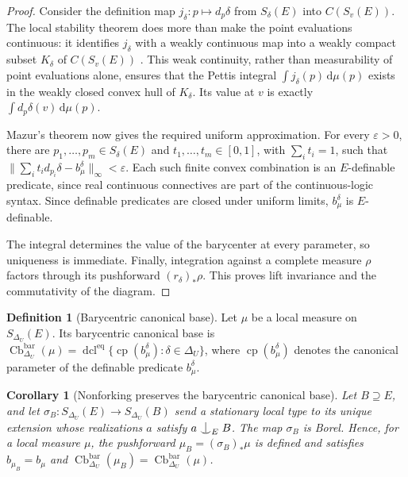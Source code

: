 \documentclass{amsart}
\newtheorem{corollary}[theorem]{Corollary}
\theoremstyle{definition}
\newtheorem{definition}{Definition}[section]
\theoremstyle{remark}
\newcommand{\forkindep}[1][]{%
	\mathrel{
		\mathop{
			\vcenter{
				\hbox{\oalign{\noalign{\kern-.3ex}\hfil$\vert$\hfil\cr
						\noalign{\kern-.7ex}
						$\smile$\cr\noalign{\kern-.3ex}}}
			}
		}\displaylimits_{#1}
	}
}
\numberwithin{equation}{section}
\begin{document}
\begin{proof}
Consider the definition map $j_\delta:p\mapsto d_p\delta$ from $S_\delta(E)$ into $C(S_v(E))$. The local stability theorem does more than make the point evaluations continuous: it identifies $j_\delta$ with a weakly continuous map into a weakly compact subset $K_\delta$ of $C(S_v(E))$ \cite[Proposition~7.7]{Yaacov2008CONTINUOUSFO}. This weak continuity, rather than measurability of point evaluations alone, ensures that the Pettis integral $\int j_\delta(p)\,\mathrm{d}\mu(p)$ exists in the weakly closed convex hull of $K_\delta$. Its value at $v$ is exactly $\int d_p\delta(v)\,\mathrm{d}\mu(p)$.

Mazur's theorem now gives the required uniform approximation. For
every $\varepsilon>0$, there are
$p_1,\ldots,p_m\in S_\delta(E)$ and
$t_1,\ldots,t_m\in[0,1]$, with $\sum_it_i=1$, such that
$\|\sum_it_id_{p_i}\delta-b_\mu^\delta\|_\infty<\varepsilon$.
Each such finite convex combination is an $E$-definable predicate, since real continuous connectives are part of the continuous-logic syntax. %
Since definable predicates are closed under uniform limits,
$b_\mu^\delta$ is $E$-definable.

The integral determines the value of the barycenter at every
parameter, so uniqueness is immediate. Finally, integration against a complete measure $\rho$ factors through its pushforward $(r_\delta)_*\rho$. This proves lift invariance and the commutativity of the diagram.
\end{proof}

\begin{definition}[Barycentric canonical base]
Let $\mu$ be a local measure on $S_{\Delta_U}(E)$. Its barycentric
canonical base is
$\operatorname{Cb}^{\mathrm{bar}}_{\Delta_U}(\mu)=
\operatorname{dcl}^{\mathrm{eq}}
\{\operatorname{cp}(b_\mu^\delta):\delta\in\Delta_U\}$,
where $\operatorname{cp}(b_\mu^\delta)$ denotes the canonical
parameter of the definable predicate $b_\mu^\delta$. %
\end{definition}

\begin{corollary}[Nonforking preserves the barycentric canonical base]
\label{cor:nonforking-preserves-barycentric-cb}
Let $B\supseteq E$, and let
$\sigma_B:S_{\Delta_U}(E)\to S_{\Delta_U}(B)$ send a stationary local
type to its unique extension whose realizations $a$ satisfy
$a\forkindep[E]B$. The map $\sigma_B$ is Borel. Hence, for a local
measure $\mu$, the pushforward $\mu_B=(\sigma_B)_*\mu$ is defined and
satisfies
$b_{\mu_B}=b_\mu$ and
$\operatorname{Cb}^{\mathrm{bar}}_{\Delta_U}(\mu_B)=
\operatorname{Cb}^{\mathrm{bar}}_{\Delta_U}(\mu)$.
\end{corollary}
\end{document}

